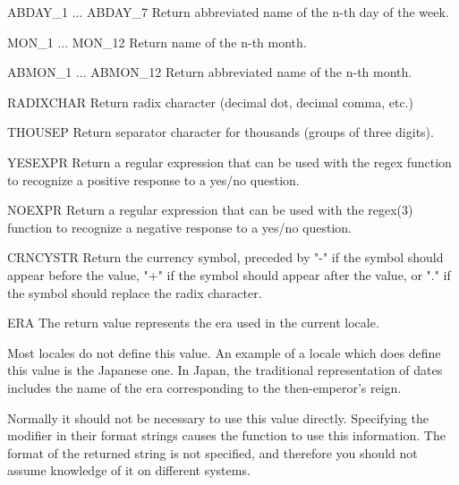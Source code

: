\begin{datadesc}{ABDAY_1 ... ABDAY_7}
Return abbreviated name of the n-th day of the week.
\end{datadesc}

\begin{datadesc}{MON_1 ... MON_12}
Return name of the n-th month.
\end{datadesc}

\begin{datadesc}{ABMON_1 ... ABMON_12}
Return abbreviated name of the n-th month.
\end{datadesc}

\begin{datadesc}{RADIXCHAR}
Return radix character (decimal dot, decimal comma, etc.)
\end{datadesc}

\begin{datadesc}{THOUSEP}
Return separator character for thousands (groups of three digits).
\end{datadesc}

\begin{datadesc}{YESEXPR}
Return a regular expression that can be used with the regex
function to recognize a positive response to a yes/no question.
\end{datadesc}

\begin{datadesc}{NOEXPR}
Return a regular expression that can be used with the regex(3)
function to recognize a negative response to a yes/no question.
\end{datadesc}

\begin{datadesc}{CRNCYSTR}
Return the currency symbol, preceded by "-" if the symbol should
appear before the value, "+" if the symbol should appear after the
value, or "." if the symbol should replace the radix character.
\end{datadesc}

\begin{datadesc}{ERA}
The return value represents the era used in the current locale.

Most locales do not define this value.  An example of a locale which
does define this value is the Japanese one.  In Japan, the traditional
representation of dates includes the name of the era corresponding to
the then-emperor's reign.

Normally it should not be necessary to use this value directly.
Specifying the  modifier in their format strings causes the
 function to use this information.  The format of the
returned string is not specified, and therefore you should not assume
knowledge of it on different systems.
\end{datadesc}

